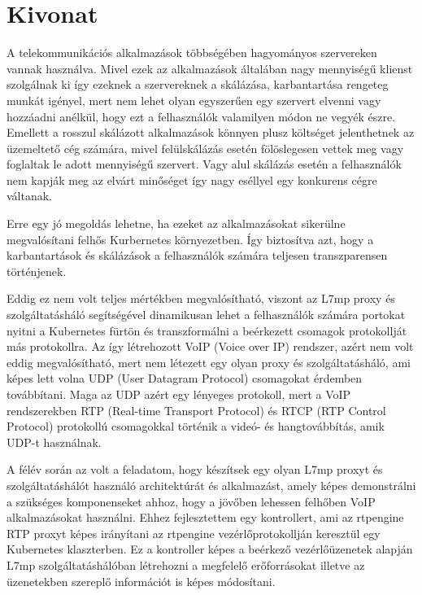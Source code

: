 \setcounter{page}{1}

\selecthungarian

\chapter*{Kivonat}

A telekommunikációs alkalmazások többségében hagyományos szervereken vannak
használva. Mivel ezek az alkalmazások általában nagy mennyiségű klienst szolgálnak 
ki így ezeknek a szervereknek a skálázása, karbantartása rengeteg munkát igényel,
mert nem lehet olyan egyszerűen egy szervert elvenni vagy hozzáadni anélkül, hogy
ezt a felhasználók valamilyen módon ne vegyék észre. Emellett a rosszul skálázott 
alkalmazások könnyen plusz költséget jelenthetnek az üzemeltető cég számára, mivel 
felülskálázás esetén fölöslegesen vettek meg vagy foglaltak le adott mennyiségű 
szervert. Vagy alul skálázás esetén a felhasználók nem kapják meg az elvárt minőséget
így nagy eséllyel egy konkurens cégre váltanak. 

Erre egy jó megoldás lehetne, ha ezeket az alkalmazásokat sikerülne megvalósítani
felhős Kurbernetes környezetben. Így biztosítva azt, hogy a karbantartások és
skálázások a felhasználók számára teljesen transzparensen történjenek.

Eddig ez nem volt teljes mértékben megvalósítható, viszont az L7mp proxy és 
szolgáltatásháló segítségével dinamikusan lehet a felhasználók számára portokat
nyitni a Kubernetes fürtön és transzformálni a beérkezett csomagok protokollját 
más protokollra. Az így létrehozott VoIP (Voice over IP) rendszer, azért nem volt eddig megvalósítható, mert nem létezett egy olyan
proxy és szolgáltatásháló, ami képes lett volna UDP (User Datagram Protocol) 
csomagokat érdemben továbbítani. Maga az UDP azért egy lényeges protokoll, mert a 
VoIP rendszerekben RTP (Real-time Transport Protocol) és 
RTCP (RTP Control Protocol) protokollú csomagokkal történik a videó- és 
hangtovábbítás, amik UDP-t használnak.

A félév során az volt a feladatom, hogy készítsek egy olyan L7mp proxyt és 
szolgáltatáshálót használó architektúrát és alkalmazást, amely képes demonstrálni
a szükséges komponenseket ahhoz, hogy a jövőben lehessen felhőben VoIP 
alkalmazásokat használni. Ehhez fejlesztettem egy kontrollert, ami az rtpengine
RTP proxyt képes irányítani az rtpengine vezérlőprotokollján keresztül egy
Kubernetes klaszterben. Ez a kontroller képes a beérkező vezérlőüzenetek alapján 
L7mp szolgáltatáshálóban létrehozni a megfelelő erőforrásokat illetve az üzenetekben
szereplő információt is képes módosítani. 

